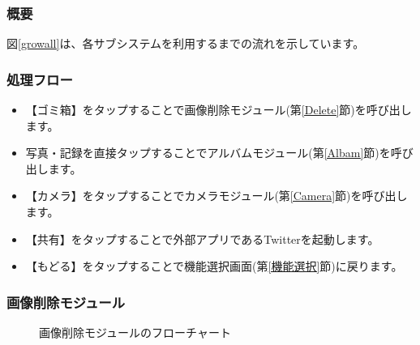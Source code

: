 \documentclass[a4j]{jarticle}
\begin{document}
\subsubsection*{概要}
図\ref{growall}は、各サブシステムを利用するまでの流れを示しています。

\subsubsection*{処理フロー}
\begin{itemize}
\item 【ゴミ箱】をタップすることで画像削除モジュール(第\ref{Delete}節)を呼び出します。

\item 写真・記録を直接タップすることでアルバムモジュール(第\ref{Albam}節)を呼び出します。

\item 【カメラ】をタップすることでカメラモジュール(第\ref{Camera}節)を呼び出します。

\item 【共有】をタップすることで外部アプリであるTwitterを起動します。

\item 【もどる】をタップすることで機能選択画面(第\ref{機能選択}節)に戻ります。
\end{itemize}

\subsubsection{画像削除モジュール\label{Delete}}
\begin{figure}[H]
    \begin{center}
    \caption {画像削除モジュールのフローチャート}
    \label{delete}
    \end{center}
\end{figure}
\end{document}
